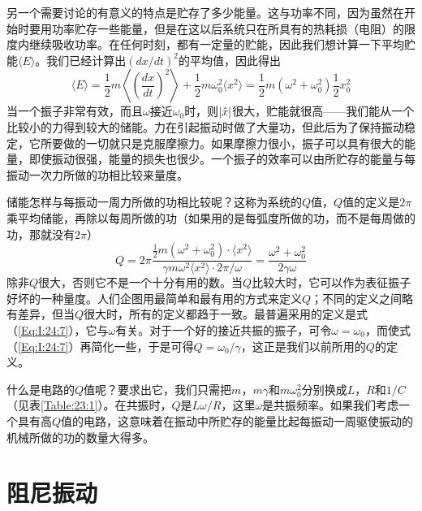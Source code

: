 另一个需要讨论的有意义的特点是贮存了多少能量。这与功率不同，因为虽然在开始时要用功率贮存一些能量，但是在这以后系统只在所具有的热耗损（电阻）的限度内继续吸收功率。在任何时刻，都有一定量的贮能，因此我们想计算一下平均贮能$\langle E \rangle$。我们已经计算出$(dx/dt)^2$的平均值，因此得出
\begin{equation}
    \label{Eq:I:24:6}
    \langle E \rangle = \frac{1}{2}m \left \langle \left ( \frac{dx}{dt} \right )^2 \right \rangle + \frac{1}{2}m\omega_0^2 \langle x^2 \rangle = \frac{1}{2}m(\omega^2 + \omega_0^2)\frac{1}{2}x_0^2
\end{equation}
当一个振子非常有效，而且$\omega$接近$\omega_0$时，则$\lvert\hat{x}\rvert$很大，贮能就很高——我们能从一个比较小的力得到较大的储能。力在引起振动时做了大量功，但此后为了保持振动稳定，它所要做的一切就只是克服摩擦力。如果摩擦力很小，振子可以具有很大的能量，即使振动很强，能量的损失也很少。一个振子的效率可以由所贮存的能量与每振动一次力所做的功相比较来量度。

储能怎样与每振动一周力所做的功相比较呢？这称为系统的$Q$值，$Q$值的定义是$2\pi$乘平均储能，再除以每周所做的功（如果用的是每弧度所做的功，而不是每周做的功，那就没有$2\pi$）
\begin{equation}
    \label{Eq:I:24:7}
    Q=2\pi \frac{\frac{1}{2}m(\omega^2 + \omega_0^2) \cdot \langle x^2 \rangle}{\gamma m \omega^2 \langle x^2 \rangle \cdot 2\pi / \omega} = \frac{\omega^2 + \omega_0^2}{2\gamma\omega}
\end{equation}
除非$Q$很大，否则它不是一个十分有用的数。当$Q$比较大时，它可以作为表征振子好坏的一种量度。人们企图用最简单和最有用的方式来定义$Q$；不同的定义之间略有差异，但当$Q$很大时，所有的定义都趋于一致。最普遍采用的定义是式（\ref{Eq:I:24:7}），它与$\omega$有关。对于一个好的接近共振的振子，可令$\omega=\omega_0$，而使式（\ref{Eq:I:24:7}）再简化一些，于是可得$Q=\omega_0/\gamma$，这正是我们以前所用的$Q$的定义。

什么是电路的$Q$值呢？要求出它，我们只需把$m$，$m\gamma$和$m\omega^2_0$分别换成$L$，$R$和$1/C$（见表\ref{Table:23:1}）。在共振时，$Q$是$L\omega/R$，这里$\omega$是共振频率。如果我们考虑一个具有高$Q$值的电路，这意味着在振动中所贮存的能量比起每振动一周驱使振动的机械所做的功的数量大得多。

\section{阻尼振动}

